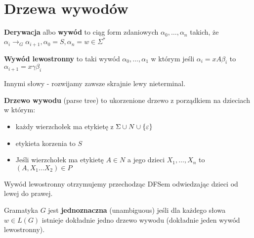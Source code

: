 \section{Drzewa wywodów}

\begin{definition}
    \textbf{Derywacja} albo \textbf{wywód} to ciąg form zdaniowych \( \alpha_0, \dots, \alpha_n \)
    takich, że \( \alpha_i \rightarrow_G \alpha_{i+1}, \alpha_0 = S, \alpha_n = w \in \Sigma^*\)
\end{definition}
\begin{definition}
    \textbf{Wywód lewostronny} to taki wywód \( \alpha_0, \dots, \alpha_1 \)
    w którym jeśli \( \alpha_i = xA\beta_i \)
    to \( \alpha_{i+1} = x\gamma\beta_i \)
    
    Innymi słowy - rozwijamy zawsze skrajnie lewy nieterminal.
\end{definition}

\begin{definition}
    \textbf{Drzewo wywodu} (parse tree) to ukorzenione drzewo z porządkiem na dzieciach w którym:
    \begin{itemize}
        \item każdy wierzchołek ma etykietę z \( \Sigma \cup N \cup \set{\eps} \)
        \item etykieta korzenia to \( S \)
        \item Jeśli wierzchołek ma etykietę \( A \in N \) a jego dzieci \( X_1, \dots, X_n \) to \( (A, X_1\dots X_2) \in P \)
    \end{itemize}
\end{definition}
Wywód lewostronny otrzymujemy przechodząc DFSem odwiedzając dzieci od lewej do prawej.

\begin{definition}
    Gramatyka \( G \) jest \textbf{jednoznaczna} (unambiguous) jeśli dla każdego słowa \( w \in L(G) \) istnieje dokładnie jedno drzewo wywodu
    (dokładnie jeden wywód lewostronny).
\end{definition}